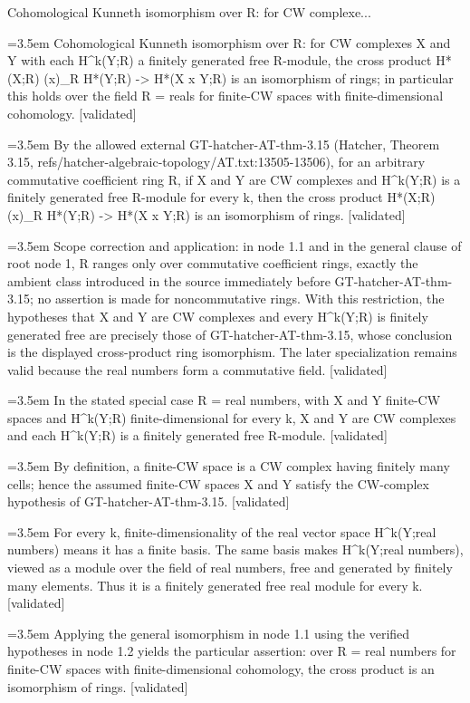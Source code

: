 \documentclass{article}
\newcommand{\step}[1]{\par\noindent\hangindent=3.5em\hangafter=1%
  \makebox[3.5em][l]{\textbf{#1.}}}
\newcommand{\steptag}[1]{\hfill{\small\textsf{[#1]}}}
\begin{document}
\begin{proofbox}{Cohomological Kunneth isomorphism over R: for CW complexe...}
\step{1} Cohomological Kunneth isomorphism over R: for CW complexes X and Y with each H\textasciicircum{}k(Y;R) a finitely generated free R-module, the cross product H*(X;R) (x)\_R H*(Y;R) -> H*(X x Y;R) is an isomorphism of rings; in particular this holds over the field R = reals for finite-CW spaces with finite-dimensional cohomology. \steptag{validated} \\[6pt]
\step{1.1} By the allowed external GT-hatcher-AT-thm-3.15 (Hatcher, Theorem 3.15, refs/hatcher-algebraic-topology/AT.txt:13505-13506), for an arbitrary commutative coefficient ring R, if X and Y are CW complexes and H\textasciicircum{}k(Y;R) is a finitely generated free R-module for every k, then the cross product H*(X;R) (x)\_R H*(Y;R) -> H*(X x Y;R) is an isomorphism of rings. \steptag{validated} \\[6pt]
\step{1.1.1} Scope correction and application: in node 1.1 and in the general clause of root node 1, R ranges only over commutative coefficient rings, exactly the ambient class introduced in the source immediately before GT-hatcher-AT-thm-3.15; no assertion is made for noncommutative rings. With this restriction, the hypotheses that X and Y are CW complexes and every H\textasciicircum{}k(Y;R) is finitely generated free are precisely those of GT-hatcher-AT-thm-3.15, whose conclusion is the displayed cross-product ring isomorphism. The later specialization remains valid because the real numbers form a commutative field. \steptag{validated} \\[4pt]
\step{1.2} In the stated special case R = real numbers, with X and Y finite-CW spaces and H\textasciicircum{}k(Y;R) finite-dimensional for every k, X and Y are CW complexes and each H\textasciicircum{}k(Y;R) is a finitely generated free R-module. \steptag{validated} \\[6pt]
\step{1.2.1} By definition, a finite-CW space is a CW complex having finitely many cells; hence the assumed finite-CW spaces X and Y satisfy the CW-complex hypothesis of GT-hatcher-AT-thm-3.15. \steptag{validated} \\[4pt]
\step{1.2.2} For every k, finite-dimensionality of the real vector space H\textasciicircum{}k(Y;real numbers) means it has a finite basis. The same basis makes H\textasciicircum{}k(Y;real numbers), viewed as a module over the field of real numbers, free and generated by finitely many elements. Thus it is a finitely generated free real module for every k. \steptag{validated} \\[4pt]
\step{1.3} Applying the general isomorphism in node 1.1 using the verified hypotheses in node 1.2 yields the particular assertion: over R = real numbers for finite-CW spaces with finite-dimensional cohomology, the cross product is an isomorphism of rings. \steptag{validated} \\[4pt]
\end{proofbox}
\end{document}
